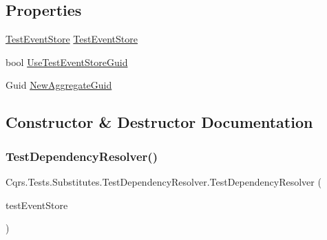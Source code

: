 \subsection*{Properties}
\begin{DoxyCompactItemize}
\item 
\hyperlink{classCqrs_1_1Tests_1_1Substitutes_1_1TestEventStore}{Test\+Event\+Store} \hyperlink{classCqrs_1_1Tests_1_1Substitutes_1_1TestDependencyResolver_a1102f66163e9313777a41fff54aa5a75_a1102f66163e9313777a41fff54aa5a75}{Test\+Event\+Store}
\item 
bool \hyperlink{classCqrs_1_1Tests_1_1Substitutes_1_1TestDependencyResolver_a000d2ee924b6f60bc77174495ad9ca89_a000d2ee924b6f60bc77174495ad9ca89}{Use\+Test\+Event\+Store\+Guid}
\item 
Guid \hyperlink{classCqrs_1_1Tests_1_1Substitutes_1_1TestDependencyResolver_a8df7ff7fb6f8bd3b2da43fadd46f1cf8_a8df7ff7fb6f8bd3b2da43fadd46f1cf8}{New\+Aggregate\+Guid}
\end{DoxyCompactItemize}


\subsection{Constructor \& Destructor Documentation}
\mbox{\label{classCqrs_1_1Tests_1_1Substitutes_1_1TestDependencyResolver_ab0ecd39381883a73869c061bc60ebff8_ab0ecd39381883a73869c061bc60ebff8}} 
\subsubsection{\texorpdfstring{Test\+Dependency\+Resolver()}{TestDependencyResolver()}}
{\footnotesize\ttfamily Cqrs.\+Tests.\+Substitutes.\+Test\+Dependency\+Resolver.\+Test\+Dependency\+Resolver (\begin{DoxyParamCaption}\item[{\hyperlink{classCqrs_1_1Tests_1_1Substitutes_1_1TestEventStore}{Test\+Event\+Store}}]{test\+Event\+Store }\end{DoxyParamCaption})}



